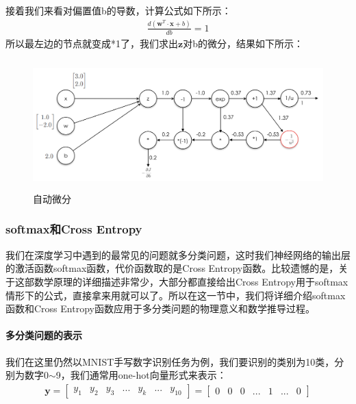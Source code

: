 \documentclass[UTF8]{article}
\begin{document}
接着我们来看对偏置值b的导数，计算公式如下所示：
\begin{equation}
\begin{aligned}
\frac{d(\boldsymbol{w}^T \cdot \boldsymbol{x} + b)}{db}=1
\end{aligned}
\label{mlp-sigmoid-cg-20}
\end{equation}
所以最左边的节点就变成*1了，我们求出$\boldsymbol{z}$对b的微分，结果如下所示：
\begin{figure}[H]
	\caption{自动微分}
	\label{f000060}
	\centering
	\includegraphics[height=5cm]{images/f000060}
\end{figure}

\subsubsection{softmax和Cross Entropy}
我们在深度学习中遇到的最常见的问题就多分类问题，这时我们神经网络的输出层的激活函数softmax函数，代价函数取的是Cross Entropy函数。比较遗憾的是，关于这部数学原理的详细描述非常少，大部分都直接给出Cross Entropy用于softmax情形下的公式，直接拿来用就可以了。所以在这一节中，我们将详细介绍softmax函数和Cross Entropy函数应用于多分类问题的物理意义和数学推导过程。
\paragraph{多分类问题的表示}
我们在这里仍然以MNIST手写数字识别任务为例，我们要识别的类别为10类，分别为数字0$\sim$9，我们通常用one-hot向量形式来表示：
\begin{equation}
\begin{aligned}
\boldsymbol{y}=\begin{bmatrix}
y_1 & y_2 & y_3 & ... & y_k & ...& y_{10}
\end{bmatrix}=\begin{bmatrix}
0 & 0 & 0 & ... & 1 & ...& 0
\end{bmatrix}
\end{aligned}
\label{mlp-mnist-one-hot-vector}
\end{equation}
\end{document}
